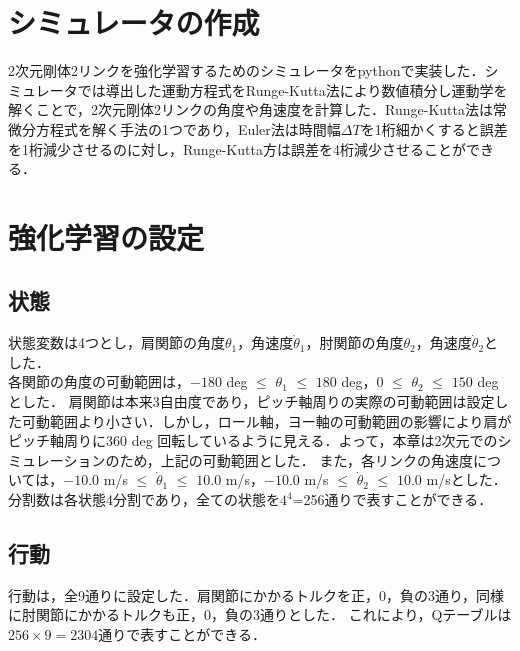 \section{シミュレータの作成}
2次元剛体2リンクを強化学習するためのシミュレータをpythonで実装した．シミュレータでは導出した運動方程式をRunge-Kutta法\cite{runge-kutta}により数値積分し運動学を解くことで，2次元剛体2リンクの角度や角速度を計算した．Runge-Kutta法は常微分方程式を解く手法の1つであり，Euler法は時間幅$\Delta T$を1桁細かくすると誤差を1桁減少させるのに対し，Runge-Kutta方は誤差を4桁減少させることができる．
\section{強化学習の設定}
\subsection{状態}
状態変数は4つとし，肩関節の角度$\theta_{1}$，角速度$\dot{\theta}_{1}$，肘関節の角度$\theta_{2}$，角速度$\dot{\theta}_{2}$とした．\\
各関節の角度の可動範囲は，$-180$ deg $\le$ $\theta_{1}$ $\le$ $180$ deg，$0$ $\le$ $\theta_{2}$ $\le$ $150$ deg\cite{range}とした．
肩関節は本来3自由度であり，ピッチ軸周りの実際の可動範囲は設定した可動範囲より小さい．しかし，ロール軸，ヨー軸の可動範囲の影響により肩がピッチ軸周りに$360$ deg 回転しているように見える．よって，本章は2次元でのシミュレーションのため，上記の可動範囲とした．
また，各リンクの角速度については，$-10.0$ m/s $\le$ $\dot{\theta}_{1}$ $\le$ $10.0$ m/s，$-10.0$ m/s $\le$ $\dot{\theta}_{2}$ $\le$ $10.0$ m/sとした．
分割数は各状態4分割であり，全ての状態を$4^{4}$=256通りで表すことができる．
\subsection{行動}
行動は，全9通りに設定した．肩関節にかかるトルクを正，0，負の3通り，同様に肘関節にかかるトルクも正，0，負の3通りとした．
これにより，Qテーブルは$256 \times 9=2304$通りで表すことができる．
